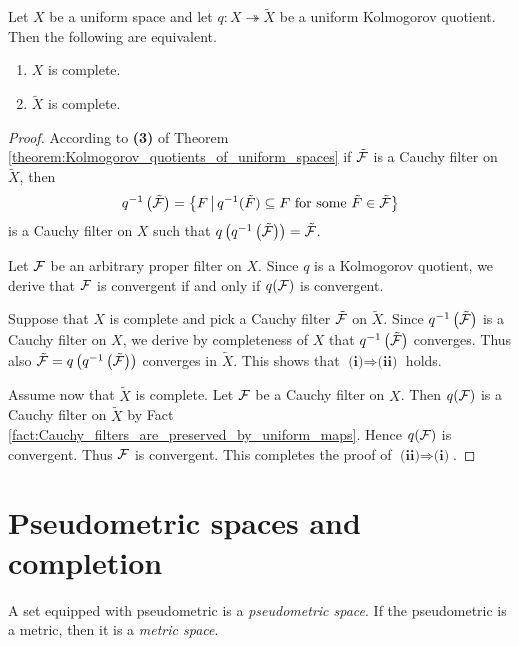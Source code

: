 \documentclass[10pt]{amsart}
\begin{document}
\begin{theorem}\label{theorem:completeness_is_preserved_and_reflected_by_uniform_Kolmogorov_quotients}
	Let $X$ be a uniform space and let $q:X\twoheadrightarrow \tilde{X}$ be a uniform Kolmogorov quotient. Then the following are equivalent.
	\begin{enumerate}[label=\emph{\textbf{(\roman*)}}, leftmargin=3.0em]
		\item $X$ is complete.
		\item $\tilde{X}$ is complete.
	\end{enumerate}
\end{theorem}
\begin{proof}
	According to \textbf{(3)} of Theorem \ref{theorem:Kolmogorov_quotients_of_uniform_spaces} if $\tilde{{\mathcal F}}$ is a Cauchy filter on $\tilde{X}$, then
	$$q^{-1}\left(\tilde{{\mathcal F}}\right) = \big\{F\,\big|\,q^{-1}(\tilde{F}) \subseteq F\mbox{ for some }\tilde{F}\in \tilde{{\mathcal F}}\big\}$$
	is a Cauchy filter on $X$ such that $q\left(q^{-1}\left(\tilde{{\mathcal F}}\right)\right) = \tilde{{\mathcal F}}$.

	Let ${\mathcal F}$ be an arbitrary proper filter on $X$. Since $q$ is a Kolmogorov quotient, we derive that ${\mathcal F}$ is convergent if and only if $q({\mathcal F})$ is convergent.

	Suppose that $X$ is complete and pick a Cauchy filter $\tilde{{\mathcal F}}$ on $\tilde{X}$. Since $q^{-1}\left(\tilde{{\mathcal F}}\right)$ is a Cauchy filter on $X$, we derive by completeness of $X$ that $q^{-1}\left(\tilde{{\mathcal F}}\right)$ converges. Thus also $\tilde{{\mathcal F}} = q\left(q^{-1}\left(\tilde{{\mathcal F}}\right)\right)$ converges in $\tilde{X}$. This shows that $\textbf{(i)}\Rightarrow \textbf{(ii)}$ holds.

	Assume now that $\tilde{X}$ is complete. Let ${\mathcal F}$ be a Cauchy filter on $X$. Then $q({\mathcal F})$ is a Cauchy filter on $\tilde{X}$ by Fact \ref{fact:Cauchy_filters_are_preserved_by_uniform_maps}. Hence $q({\mathcal F})$ is convergent. Thus ${\mathcal F}$ is convergent. This completes the proof of $\textbf{(ii)}\Rightarrow \textbf{(i)}$.
\end{proof}

\section{Pseudometric spaces and completion}

\begin{definition}
	A set equipped with pseudometric is a \textit{pseudometric space}. If the pseudometric is a metric, then it is a \textit{metric space}.
\end{definition}
\end{document}
